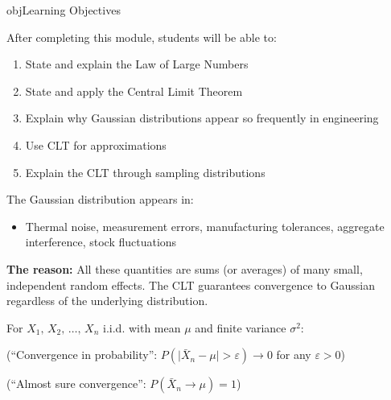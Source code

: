 \begin{PSbox}[unbreakable]{obj}{Learning Objectives}

After completing this module, students will be able to:

\begin{enumerate}
\def\labelenumi{\arabic{enumi}.}
\tightlist
\item
  State and explain the Law of Large Numbers
\item
  State and apply the Central Limit Theorem
\item
  Explain why Gaussian distributions appear so frequently in engineering
\item
  Use CLT for approximations
\item
  Explain the CLT through sampling distributions
\end{enumerate}

\end{PSbox}


The Gaussian distribution appears in:

\begin{itemize}
\tightlist
\item
  Thermal noise, measurement errors, manufacturing tolerances, aggregate interference, stock fluctuations
\end{itemize}

\textbf{The reason:} All these quantities are sums (or averages) of many small, independent random effects. The CLT guarantees convergence to Gaussian regardless of the underlying distribution.



For $X_{1},\, X_{2},\, \ldots,\, X_{n}$ i.i.d. with mean $\mu$ and finite variance $\sigma^{2}$:


(``Convergence in probability'': $P(\lvert \bar{X}_{n} - \mu\rvert > \varepsilon) \to 0$ for any $\varepsilon > 0$)



(``Almost sure convergence'': $P(\bar{X}_{n} \to \mu) = 1$)

